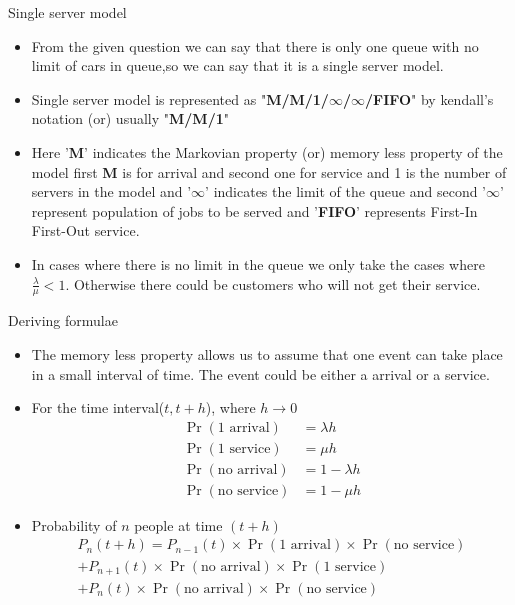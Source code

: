 \documentclass{beamer}
\begin{document}
\begin{frame}{Single server model}
    \begin{itemize}
        \item From the given question we can say that there is only one queue with no limit of cars in queue,so we can say that it is a single server model.
        \item Single server model is represented as "\textbf{M/M/1/$\infty$/$\infty$/FIFO}" by kendall's notation (or) usually "\textbf{M/M/1}"
        \item  Here '\textbf{M}' indicates the Markovian property (or) memory less property of the model first \textbf{M} is for arrival and second one for service and 1 is the number of servers in the model and '$\infty$' indicates the limit of the queue and second '$\infty$' represent population of jobs to be served and '\textbf{FIFO}' represents First-In First-Out service.
        \item In cases where there is no limit in the queue we only take the cases where $\frac{\lambda}{\mu}<1$. Otherwise there could be customers who will not get their service.
    \end{itemize}
\end{frame}
\begin{frame}{Deriving formulae}
    \begin{itemize}
    \item The memory less property allows us to assume that one event can take place in a small interval of time. The event could be either a arrival or a service.
    \item  For the time interval($t,t+h$), where $h \to 0$
\begin{align}
    \Pr{(\text{1 arrival})}&=\lambda h\\
    \Pr{(\text{1 service})}&=\mu h\\
    \Pr{(\text{no arrival})}&=1-\lambda h\\
    \Pr{(\text{no service})}&=1-\mu h
\end{align}
\item Probability of $n$ people at time $(t+h)$
\begin{multline}
    P_{n}(t+h)=P_{n-1}(t)\times\Pr{(\text{1 arrival})}\times\Pr{(\text{no service})}\\
    +P_{n+1}(t)\times\Pr{(\text{no arrival})}\times\Pr{(\text{1 service})}\\
    +P_n(t)\times\Pr{(\text{no arrival})}\times\Pr{(\text{no service})}\label{eq:eq1}
\end{multline}
    \end{itemize}
\end{frame}
\end{document}
